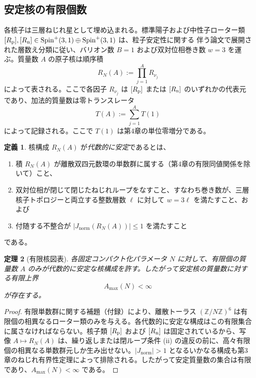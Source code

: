 \documentclass[a4paper]{article}
\newtheorem{theorem}{定理}[section]
\theoremstyle{definition}
\newtheorem{definition}[theorem]{定義}
\theoremstyle{remark}
\newcommand{\Jnorm}{J_{\mathrm{norm}}}
\begin{document}
\subsection{安定核の有限個数}

各核子は三層ねじれ星として埋め込まれる。標準陽子および中性子ローター類 \( [R_{\rm p}], [R_{\rm n}] \in \mathrm{Spin}^+(3,1) \oplus \mathrm{Spin}^+(3,1) \) は、粒子安定性に関する 伴う論文で展開された層数え分類に従い、バリオン数 \(B=1\) および双対位相巻き数 \(w=3\) を運ぶ。質量数 \(A\) の原子核は順序積
\[
R_N(A) := \prod_{j=1}^{A} R_{\nu_j}
\]
によって表される。ここで各因子 \(R_{\nu_j}\) は \([R_{\rm p}]\) または \([R_{\rm n}]\) のいずれかの代表元であり、加法的質量数は零トランスレータ
\[
T(A) := \sum_{j=1}^{A} T(1)
\]
によって記録される。ここで \(T(1)\) は第4章の単位零増分である。

\begin{definition}
核構成 \(R_N(A)\) が\emph{代数的に安定}であるとは、
\begin{enumerate}[label=(\roman*)]
  \item 積 \(R_N(A)\) が離散双四元数環の単数群に属する（第4章の有限同値関係を除いて）こと、
  \item 双対位相が閉じて閉じたねじれループをなすこと、すなわち巻き数が、三層核子トポロジーと両立する整数層数 \(\ell\) に対して \(w = 3\ell\) を満たすこと、および
  \item 付随する不整合が \(|\Jnorm(R_N(A))| \leq 1\) を満たすこと
\end{enumerate}
である。
\end{definition}

\begin{theorem}[有限核図表]
各固定コンパクト化パラメータ \(N\) に対して、有限個の質量数 \(A\) のみが代数的に安定な核構成を許す。したがって安定核の質量数に対する有限上界
\[
A_{\max}(N) < \infty
\]
が存在する。
\end{theorem}

\begin{proof}
有限単数群に関する補題（付録）により、離散トーラス \((\mathbb{Z}/N\mathbb{Z})^6\) は有限個の相異なるローター類のみを与える。各代数的に安定な構成はこの有限集合に属さなければならない。核子類 \([R_{\rm p}]\) および \([R_{\rm n}]\) は固定されているから、写像 \(A \mapsto R_N(A)\) は、繰り返しまたは閉ループ条件 (ii) の違反の前に、高々有限個の相異なる単数群元しか生み出せない。\(|\Jnorm| > 1\) となるいかなる構成も第3章のねじれ有界性定理によって排除される。したがって安定質量数の集合は有限であり、\(A_{\max}(N) < \infty\) である。
\end{proof}
\end{document}
